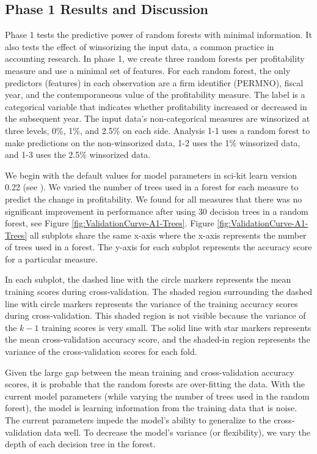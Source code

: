 \subsection{Phase 1 Results and Discussion}
Phase 1 tests the predictive power of random forests with minimal information. It also tests the effect of winsorizing the input data, a common practice in accounting research.  In phase 1, we create three random forests per profitability measure and use a minimal set of features. For each random forest, the only predictors (features) in each observation are a firm identifier (PERMNO),  fiscal year, and the contemporaneous value of the profitability measure. The label is a categorical variable that indicates whether profitability increased or decreased in the subsequent year. The input data's non-categorical measures are winsorized at three levels, 0\%, 1\%, and 2.5\% on each side. Analysis 1-1 uses a random forest to make predictions on the non-winsorized data, 1-2 uses the 1\% winsorized data, and 1-3 uses the 2.5\% winsorized data.

We begin with the default values for model parameters in sci-kit learn version 0.22 (see \cite{scikit-learn}). We varied the number of trees used in a forest for each measure to predict the change in profitability. We found for all measures that there was no significant improvement in performance after using 30 decision trees in a random forest, see Figure \ref{fig:ValidationCurve-A1-Trees}. Figure \ref{fig:ValidationCurve-A1-Trees} all subplots share the same x-axis where the x-axis represents the number of trees used in a forest. The y-axis for each subplot represents the accuracy score for a particular measure.

In each subplot, the dashed line with the circle markers represents the mean training scores during cross-validation. The shaded region surrounding the dashed line with circle markers represents the variance of the training accuracy scores during cross-validation.  This shaded region is not visible because the variance of the \(k-1\) training scores is very small. The solid line with star markers represents the mean cross-validation accuracy score, and the shaded-in region represents the variance of the cross-validation scores for each fold.

Given the large gap between the mean training and cross-validation accuracy scores, it is probable that the random forests are over-fitting the data. With the current model parameters (while varying the number of trees used in the random forest), the model is learning information from the training data that is noise. The current parameters impede the model's ability to generalize to the cross-validation data well. To decrease the model's variance (or flexibility), we vary the depth of each decision tree in the forest. 

